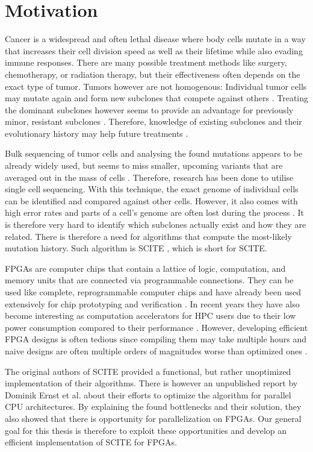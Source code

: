 \section{Motivation}

Cancer is a widespread and often lethal disease\cite{10.1001/jamaoncol.2021.6987} where body cells mutate in a way that increases their cell division speed as well as their lifetime while also evading immune responses. There are many possible treatment methods like surgery, chemotherapy, or radiation therapy, but their effectiveness often depends on the exact type of tumor. Tumors however are not homogenous: Individual tumor cells may mutate again and form new subclones that compete against others \cite{nik2012life}. Treating the dominant subclones however seems to provide an advantage for previously minor, resistant subclones \cite{gillies2012evolutionary}. Therefore, knowledge of existing subclones and their evolutionary history may help future treatments \cite{greaves2012clonal}\cite{stratton2009cancer}\cite{swanton2012intratumor}.

Bulk sequencing of tumor cells and analysing the found mutations appears to be already widely used, but seems to miss smaller, upcoming variants that are averaged out in the mass of cells \cite{navin2014cancer}. Therefore, research has been done to utilise single cell sequencing. With this technique, the exact genome of individual cells can be identified and compared against other cells. However, it also comes with high error rates and parts of a cell's genome are often lost during the process \cite{tree2016}. It is therefore very hard to identify which subclones actually exist and how they are related. There is therefore a need for algorithms that compute the most-likely mutation history. Such algorithm is \acs{SCITE} \cite{tree2016}, which is short for \acl{SCITE}.

\acp{FPGA} are computer chips that contain a lattice of logic, computation, and memory units that are connected via programmable connections. They can be used like complete, reprogrammable computer chips and have already been used extensively for chip prototyping and verification \cite{rodriguez2007features}. In recent years they have also become interesting as computation accelerators for \ac{HPC} users due to their low power consumption compared to their performance \cite{betkaoui2010comparing}. However, developing efficient \ac{FPGA} designs is often tedious since compiling them may take multiple hours and naive designs are often multiple orders of magnitudes worse than optimized ones \cite{betkaoui2010comparing}.

The original authors of \ac{SCITE} provided a functional, but rather unoptimized implementation of their algorithms. There is however an unpublished report by Dominik Ernst et al. \cite{ernst2020Performance} about their efforts to optimize the algorithm for parallel CPU architectures. By explaining the found bottlenecks and their solution, they also showed that there is opportunity for parallelization on \acp{FPGA}. Our general goal for this thesis is therefore to exploit these opportunities and develop an efficient implementation of \ac{SCITE} for \acp{FPGA}. 
